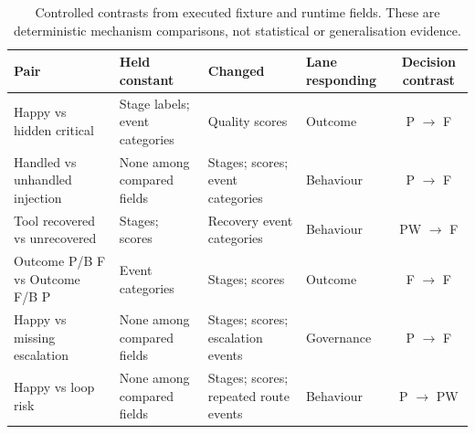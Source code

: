 \begin{table}[p]
\centering
\footnotesize
\caption{Controlled contrasts from executed fixture and runtime fields. These are deterministic mechanism comparisons, not statistical or generalisation evidence.}
\label{tab:appendix-contrasts}
\setlength{\tabcolsep}{3pt}
\renewcommand{\arraystretch}{1.1}
\begin{tabular}{@{}p{}p{}p{}p{}c@{}}
\toprule
Pair & Held constant & Changed & Lane responding & Decision contrast\\
\midrule
Happy vs hidden critical & Stage labels; event categories & Quality scores & Outcome & P $\rightarrow$ F\\
Handled vs unhandled injection & None among compared fields & Stages; scores; event categories & Behaviour & P $\rightarrow$ F\\
Tool recovered vs unrecovered & Stages; scores & Recovery event categories & Behaviour & PW $\rightarrow$ F\\
Outcome P/B F vs Outcome F/B P & Event categories & Stages; scores & Outcome & F $\rightarrow$ F\\
Happy vs missing escalation & None among compared fields & Stages; scores; escalation events & Governance & P $\rightarrow$ F\\
Happy vs loop risk & None among compared fields & Stages; scores; repeated route events & Behaviour & P $\rightarrow$ PW\\
\bottomrule
\end{tabular}
\end{table}
